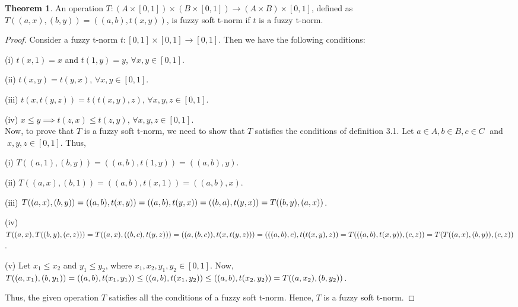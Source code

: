 \documentclass{article}
\theoremstyle{definition}
\newtheorem{theorem}{Theorem}[section]
\begin{document}
\begin{theorem}
    An operation $T:(A\times[0, 1])\times (B\times[0, 1]) \to (A\times B)\times[0, 1]$, defined as $T((a, x), (b, y)) =  ((a, b), t(x, y))$, is fuzzy soft t-norm if $t$ is a fuzzy t-norm.
\end{theorem}
\begin{proof}
     Consider a fuzzy t-norm $t:[0, 1]\times [0, 1] \to [0, 1]$. Then we have the following conditions:
    
    (i) $t(x, 1)=x$ and $t(1, y)=y$, $\forall x, y \in [0, 1]$.
    
    (ii) $t(x, y)=t(y, x)$, $\forall x, y \in [0, 1]$.
    
    (iii) $t(x, t(y, z))=t(t(x, y), z)$, $\forall x, y, z\in [0, 1]$.

    (iv) $x \leq y \implies t(z, x)\leq t(z, y)$, $\forall x, y, z\in [0, 1]$.\\

Now, to prove that $T$ is a fuzzy soft t-norm, we need to show that $T$ satisfies the conditions of definition 3.1. Let $a\in A, b\in B, c\in C \;$ and $\; x, y, z\in [0, 1]$. Thus, \vspace{1.5mm}

(i) $T((a, 1), (b, y))=((a, b), t(1, y))=((a, b), y)$.

(ii) $T((a, x), (b, 1))=((a, b), t(x, 1))=((a, b), x)$.

(iii) $T((a, x), (b, y))=((a, b), t(x, y))=((a, b), t(y, 
x))=((b, a), t(y, x))\\=T((b, y), (a, x))$.

(iv) $T((a, x), T((b, y), (c, z)))=T((a, x),((b, c), t(y, z)))=((a, (b, c)), t(x, t(y, z)))\\=(((a, b), c), t(t(x, y), z))=T(((a, b), t(x, y)), (c, z))=T(T((a, x), (b, y)), (c, z))$.

(v) Let $x_1\leq x_2$ and $y_1\leq y_2$, where $x_1, x_2, y_1, y_2 \in [0, 1]$. Now, $T((a, x_1), (b, y_1))=((a, b), t(x_1, y_1)) \leq ((a, b), t(x_1, y_2)) \leq ((a, b), t(x_2, \\y_2))=T((a, x_2), (b, y_2))$. 


Thus, the given operation $T$ satisfies all the conditions of a fuzzy soft t-norm. Hence, $T$ is a fuzzy soft t-norm.
\end{proof}
\end{document}
